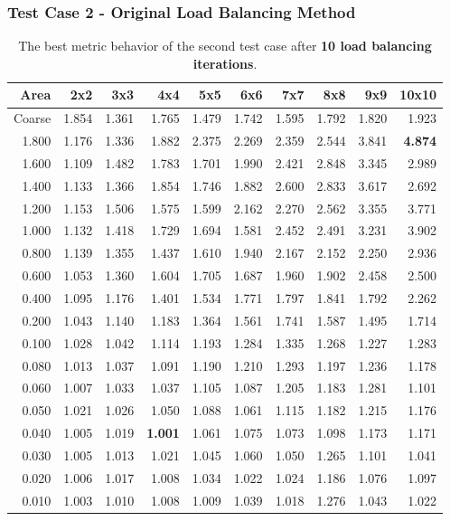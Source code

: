 \documentclass[compress]{beamer}
\begin{document}
\begin{frame}[t]\frametitle{Test Case 2 - Original Load Balancing Method}
\begin{table}[H]
\centering
\tiny
\caption{The best metric behavior of the second test case after \textbf{10 load balancing iterations}.} 
\begin{tabular}{rrrrrrrrrr}
 \hline
 Area & 2x2 &3x3 & 4x4 & 5x5 & 6x6 & 7x7 &8x8 & 9x9 & 10x10 \\ 
\hline
 Coarse & 1.854 & 1.361 & 1.765 & 1.479 & 1.742 & 1.595 & 1.792 & 1.820 & 1.923 \\
  1.800 & 1.176 & 1.336 & 1.882 & 2.375 & 2.269 & 2.359 & 2.544 & 3.841 & \textbf{\cellcolor{blue!25}4.874} \\
  1.600 & 1.109 & 1.482 & 1.783 & 1.701 & 1.990 & 2.421 & 2.848 & 3.345 & 2.989 \\
  1.400 & 1.133 & 1.366 & 1.854 & 1.746 & 1.882 & 2.600 & 2.833 & 3.617 & 2.692 \\
  1.200 & 1.153 & 1.506 & 1.575 & 1.599 & 2.162 & 2.270 & 2.562 & 3.355 & 3.771 \\
  1.000 & 1.132 & 1.418 & 1.729 & 1.694 & 1.581 & 2.452 & 2.491 & 3.231 & 3.902 \\
  0.800 & 1.139 & 1.355 & 1.437 & 1.610 & 1.940 & 2.167 & 2.152 & 2.250 & 2.936 \\
  0.600 & 1.053 & 1.360 & 1.604 & 1.705 & 1.687 & 1.960 & 1.902 & 2.458 & 2.500 \\
  0.400 & 1.095 & 1.176 & 1.401 & 1.534 & 1.771 & 1.797 & 1.841 & 1.792 & 2.262 \\
  0.200 & 1.043 & 1.140 & 1.183 & 1.364 & 1.561 & 1.741 & 1.587 & 1.495 & 1.714 \\
  0.100 & 1.028 & 1.042 & 1.114 & 1.193 & 1.284 & 1.335 & 1.268 & 1.227 & 1.283 \\
  0.080 & 1.013 & 1.037 & 1.091 & 1.190 & 1.210 & 1.293 & 1.197 & 1.236 & 1.178 \\
  0.060 & 1.007 & 1.033 & 1.037 & 1.105 & 1.087 & 1.205 & 1.183 & 1.281 & 1.101 \\
  0.050 & 1.021 & 1.026 & 1.050 & 1.088 & 1.061 & 1.115 & 1.182 & 1.215 & 1.176 \\
  0.040 & 1.005 & 1.019 & \textbf{\cellcolor{blue!25}1.001} & 1.061 & 1.075 & 1.073 & 1.098 & 1.173 & 1.171 \\
  0.030 & 1.005 & 1.013 & 1.021 & 1.045 & 1.060 & 1.050 & 1.265 & 1.101 & 1.041 \\
  0.020 & 1.006 & 1.017 & 1.008 & 1.034 & 1.022 & 1.024 & 1.186 & 1.076 & 1.097 \\
  0.010 & 1.003 & 1.010 & 1.008 & 1.009 & 1.039 & 1.018 & 1.276 & 1.043 & 1.022 \\
\hline
\end{tabular}
\end{table}
\end{frame}
\end{document}
